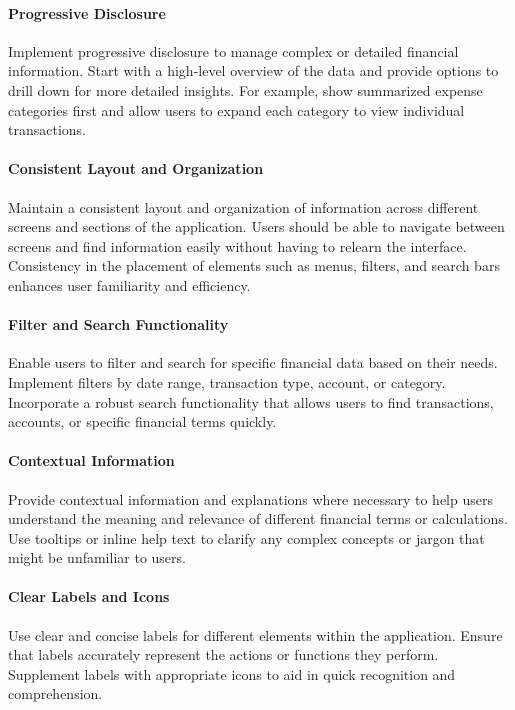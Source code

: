 \paragraph{Progressive Disclosure}
Implement progressive disclosure to manage complex or detailed financial information. Start 
with a high-level overview of the data and provide options to drill down for more detailed insights. For example, 
show summarized expense categories first and allow users to expand each category to view individual transactions.

\paragraph{Consistent Layout and Organization}
Maintain a consistent layout and organization of information across different 
screens and sections of the application. Users should be able to navigate between screens and find information easily 
without having to relearn the interface. Consistency in the placement of elements such as menus, filters, and search 
bars enhances user familiarity and efficiency.

\paragraph{Filter and Search Functionality}
Enable users to filter and search for specific financial data based on their needs. 
Implement filters by date range, transaction type, account, or category. Incorporate a robust search functionality 
that allows users to find transactions, accounts, or specific financial terms quickly.

\paragraph{Contextual Information}
Provide contextual information and explanations where necessary to help users understand the 
meaning and relevance of different financial terms or calculations. Use tooltips or inline help text to clarify any 
complex concepts or jargon that might be unfamiliar to users.

\paragraph{Clear Labels and Icons}
Use clear and concise labels for different elements within the application. Ensure 
that labels accurately represent the actions or functions they perform. Supplement labels with appropriate icons 
to aid in quick recognition and comprehension.

